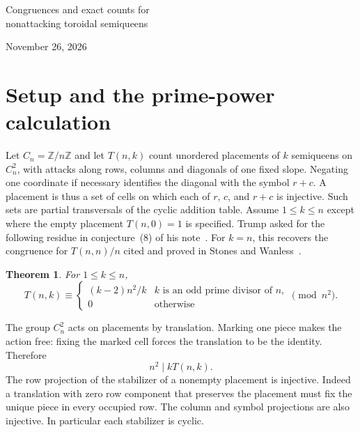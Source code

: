 \documentclass[11pt]{article}
\newtheorem{theorem}{Theorem}
\newcommand{\Z}{\mathbb Z}
\begin{document}
\begin{center}
{\LARGE Congruences and exact counts for\\[3pt] nonattacking toroidal semiqueens\par}
\medskip November 26, 2026
\end{center}
\begin{abstract}
We prove the three congruences in Walter Trump's 2021 note on toroidal semiqueens. The placement count modulo the board area vanishes except for an explicit prime-size exception. Coordinate symmetries give a divisibility theorem modulo three and the exact parity of every entry. We also answer the note's question about four semiqueens by counting partial transversals of an arbitrary Latin square in terms of its intercalates. A partition sum extends the known cyclic formulas through six pieces to seven pieces and gives formulas for every finite abelian group table.
\end{abstract}

\section{Setup and the prime-power calculation}
Let $C_n=\Z/n\Z$ and let $T(n,k)$ count unordered placements of $k$ semiqueens on $C_n^2$, with attacks along rows, columns and diagonals of one fixed slope. Negating one coordinate if necessary identifies the diagonal with the symbol $r+c$. A placement is thus a set of cells on which each of $r$, $c$, and $r+c$ is injective. Such sets are partial transversals of the cyclic addition table. Assume $1\le k\le n$ except where the empty placement $T(n,0)=1$ is specified. Trump asked for the following residue in conjecture~(8) of his note~\cite{trump}. For $k=n$, this recovers the congruence for $T(n,n)/n$ cited and proved in Stones and Wanless~\cite{compound}.

\begin{theorem}\label{thm:area}
For $1\le k\le n$,
\[
T(n,k)\equiv\begin{cases}(k-2)n^2/k & k\text{ is an odd prime divisor of }n,\\ 0&\text{otherwise}\end{cases}\pmod{n^2}.
\]
\end{theorem}

The group $C_n^2$ acts on placements by translation. Marking one piece makes the action free: fixing the marked cell forces the translation to be the identity. Therefore
\begin{equation}\label{eq:marked}n^2\mid kT(n,k).\end{equation}
The row projection of the stabilizer of a nonempty placement is injective. Indeed a translation with zero row component that preserves the placement must fix the unique piece in every occupied row. The column and symbol projections are also injective. In particular each stabilizer is cyclic.
\end{document}
